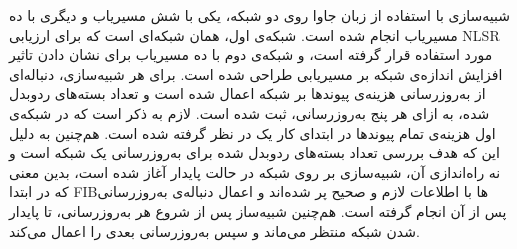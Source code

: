 شبیه‌سازی با استفاده از زبان جاوا روی دو شبکه‌، یکی با شش مسیریاب و دیگری با ده مسیریاب انجام شده است. شبکه‌ی اول، همان شبکه‌ای است که برای ارزیابی NLSR مورد استفاده قرار گرفته است، و شبکه‌ی دوم با ده مسیریاب برای نشان دادن تاثیر افزایش اندازه‌ی شبکه بر مسیریابی طراحی شده است. برای هر شبیه‌سازی، دنباله‌ای از به‌روزرسانی هزینه‌ی پیوندها بر شبکه اعمال شده است و تعداد بسته‌های ردوبدل شده، به ازای هر پنج به‌روزرسانی، ثبت شده است. لازم به ذکر است که در شبکه‌ی اول هزینه‌ی تمام پیوندها در ابتدای کار یک در نظر گرفته شده است. هم‌چنین به دلیل این که هدف بررسی تعداد بسته‌های ردوبدل شده برای به‌روزرسانی یک شبکه است و نه راه‌اندازی آن، شبیه‌سازی بر روی شبکه در حالت پایدار آغاز شده است، بدین معنی که در ابتدا FIBها با اطلاعات لازم و صحیح پر شده‌اند و اعمال دنباله‌ی به‌روزرسانی پس از آن انجام گرفته است. هم‌چنین شبیه‌ساز پس از شروع هر به‌روزرسانی، تا پایدار شدن شبکه منتظر می‌ماند و سپس به‌روزرسانی بعدی را اعمال می‌کند. 

